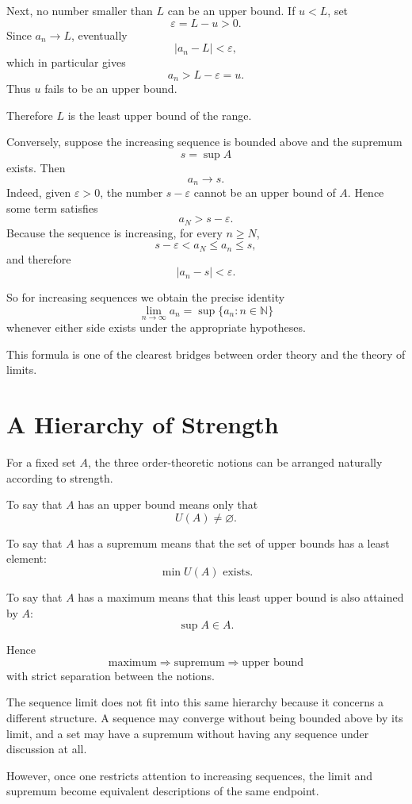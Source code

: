 \documentclass{essay}
\begin{document}
Next, no number smaller than \(L\) can be an upper bound. If \(u<L\), set
\[ \varepsilon=L-u>0. \]
Since \(a_{n}\to L\), eventually
\[ |a_{n}-L|<\varepsilon, \]
which in particular gives
\[ a_{n}>L-\varepsilon=u. \]
Thus \(u\) fails to be an upper bound.

Therefore \(L\) is the least upper bound of the range.

Conversely, suppose the increasing sequence is bounded above and the supremum
\[ s=\sup A \]
exists. Then
\[ a_{n}\to s. \]
Indeed, given \(\varepsilon>0\), the number \(s-\varepsilon\) cannot be an upper bound of \(A\). Hence some term satisfies
\[ a_{N}>s-\varepsilon. \]
Because the sequence is increasing, for every \(n\geq N\),
\[ s-\varepsilon<a_{N}\leq a_{n}\leq s, \]
and therefore
\[ |a_{n}-s|<\varepsilon. \]

So for increasing sequences we obtain the precise identity
\[ \boxed{\lim_{n\to\infty}a_{n}=\sup\{a_{n}:n\in\mathbb{N}\}} \]
whenever either side exists under the appropriate hypotheses.

This formula is one of the clearest bridges between order theory and the theory of limits.

\section{A Hierarchy of Strength}

For a fixed set \(A\), the three order-theoretic notions can be arranged naturally according to strength.

To say that \(A\) has an upper bound means only that
\[ U(A)\neq\varnothing. \]

To say that \(A\) has a supremum means that the set of upper bounds has a least element:
\[ \min U(A)\text{ exists}. \]

To say that \(A\) has a maximum means that this least upper bound is also attained by \(A\):
\[ \sup A\in A. \]

Hence
\[ \boxed{ \text{maximum} \Longrightarrow \text{supremum} \Longrightarrow \text{upper bound} } \]
with strict separation between the notions.

The sequence limit does not fit into this same hierarchy because it concerns a different structure. A sequence may converge without being bounded above by its limit, and a set may have a supremum without having any sequence under discussion at all.

However, once one restricts attention to increasing sequences, the limit and supremum become equivalent descriptions of the same endpoint.
\end{document}
